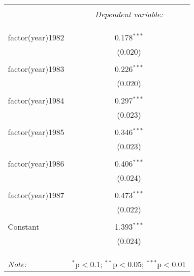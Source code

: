 
\begin{table}[!htbp] \centering 
  \caption{} 
  \label{} 
\begin{tabular}{@{\extracolsep{5pt}}lc} 
\\[-1.8ex]\hline 
\hline \\[-1.8ex] 
 & \multicolumn{1}{c}{\textit{Dependent variable:}} \\ 
\cline{2-2} 
\\[-1.8ex] &   \\ 
\hline \\[-1.8ex] 
 factor(year)1982 & 0.178$^{***}$ \\ 
  & (0.020) \\ 
  & \\ 
 factor(year)1983 & 0.226$^{***}$ \\ 
  & (0.020) \\ 
  & \\ 
 factor(year)1984 & 0.297$^{***}$ \\ 
  & (0.023) \\ 
  & \\ 
 factor(year)1985 & 0.346$^{***}$ \\ 
  & (0.023) \\ 
  & \\ 
 factor(year)1986 & 0.406$^{***}$ \\ 
  & (0.024) \\ 
  & \\ 
 factor(year)1987 & 0.473$^{***}$ \\ 
  & (0.022) \\ 
  & \\ 
 Constant & 1.393$^{***}$ \\ 
  & (0.024) \\ 
  & \\ 
\hline \\[-1.8ex] 
\hline 
\hline \\[-1.8ex] 
\textit{Note:}  & \multicolumn{1}{r}{$^{*}$p$<$0.1; $^{**}$p$<$0.05; $^{***}$p$<$0.01} \\ 
\end{tabular} 
\end{table} 
